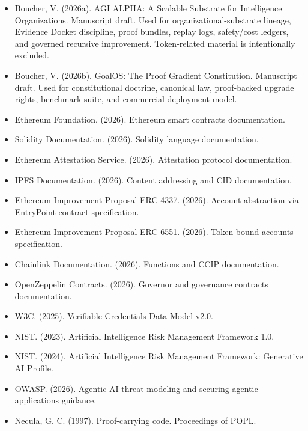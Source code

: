 \documentclass[
]{article}
\providecommand{\tightlist}{%
  \setlength{\itemsep}{0pt}\setlength{\parskip}{0pt}}
\begin{document}
\begin{itemize}
\tightlist
\item
  Boucher, V. (2026a). AGI ALPHA: A Scalable Substrate for Intelligence
  Organizations. Manuscript draft. Used for organizational-substrate
  lineage, Evidence Docket discipline, proof bundles, replay logs,
  safety/cost ledgers, and governed recursive improvement. Token-related
  material is intentionally excluded.
\item
  Boucher, V. (2026b). GoalOS: The Proof Gradient Constitution.
  Manuscript draft. Used for constitutional doctrine, canonical law,
  proof-backed upgrade rights, benchmark suite, and commercial
  deployment model.
\item
  Ethereum Foundation. (2026). Ethereum smart contracts documentation.
\item
  Solidity Documentation. (2026). Solidity language documentation.
\item
  Ethereum Attestation Service. (2026). Attestation protocol
  documentation.
\item
  IPFS Documentation. (2026). Content addressing and CID documentation.
\item
  Ethereum Improvement Proposal ERC-4337. (2026). Account abstraction
  via EntryPoint contract specification.
\item
  Ethereum Improvement Proposal ERC-6551. (2026). Token-bound accounts
  specification.
\item
  Chainlink Documentation. (2026). Functions and CCIP documentation.
\item
  OpenZeppelin Contracts. (2026). Governor and governance contracts
  documentation.
\item
  W3C. (2025). Verifiable Credentials Data Model v2.0.
\item
  NIST. (2023). Artificial Intelligence Risk Management Framework 1.0.
\item
  NIST. (2024). Artificial Intelligence Risk Management Framework:
  Generative AI Profile.
\item
  OWASP. (2026). Agentic AI threat modeling and securing agentic
  applications guidance.
\item
  Necula, G. C. (1997). Proof-carrying code. Proceedings of POPL.
\end{itemize}
\end{document}
